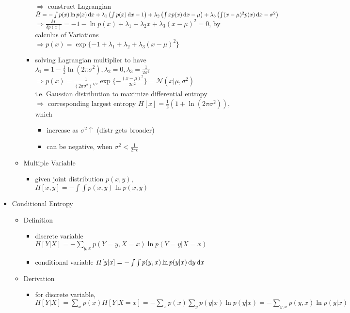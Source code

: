 \begin{itemize}
\begin{itemize}
\begin{itemize}
		$\Rightarrow$ construct Lagrangian $\tilde H = -\int p(x)\ln p(x) \mathop{}\!\mathrm{d} x + \lambda_1 \left( \int p(x)\mathop{}\!\mathrm{d} x -1 \right)+ \lambda_2\left( \int xp(x)\mathop{}\!\mathrm{d} x - \mu  \right) + \lambda_3 \left( \int (x-\mu)^2p(x)\mathop{}\!\mathrm{d} x - \sigma^2 \right)$ \\
		$\Rightarrow \frac{\delta L}{\delta p(x)} = -1 -\ln p(x)+\lambda_1 + \lambda_2 x + \lambda_3(x-\mu)^2 = 0$, by calculus of Variations \\
		$\Rightarrow p(x)=\exp \{ -1+\lambda_1+\lambda_2+\lambda_3(x-\mu)^2 \}$
		\item solving Lagrangian multiplier to have $\lambda_1=1-\frac12\ln(2\pi\sigma^2), \lambda_2=0, \lambda_3=\frac{1}{2\sigma^2}$ \\
		$\Rightarrow p(x)=\frac{1}{(2\pi\sigma^2)^{1/2}}\exp \{ -\frac{(x-\mu)^2}{2\sigma^2} \} = \mathcal N(x|\mu, \sigma^2)$ \\
		i.e. Gaussian distribution to maximize differential entropy \\
		$\Rightarrow$ corresponding largest entropy $H[x] = \frac12 (1+\ln(2\pi\sigma^2))$, which \\
			\begin{itemize}
			\item increase as $\sigma^2\uparrow$ (distr gets broader)
			\item can be negative, when $\sigma^2<\frac{1}{2\pi e}$
			\end{itemize}
		\end{itemize}
	\item Multiple Variable
		\begin{itemize}
		\item given joint distribution $p(x, y)$, $H[x,y]=-\int\int p(x, y)\ln p(x, y)$
		\end{itemize}
	\end{itemize}
\item Conditional Entropy
	\begin{itemize}
	\item Definition
		\begin{itemize}
		\item discrete variable $H[Y|X] = -\sum_{y, x}p(Y=y, X=x)\ln p(Y=y|X=x)$
		\item conditional variable $H[y|x] = -\int\int p(y, x)\ln p(y|x) \mathop{}\!\mathrm{d} y\mathop{}\!\mathrm{d} x$
		\end{itemize}
	\item Derivation
		\begin{itemize}
		\item for discrete variable, $H[Y|X] = \sum_x p(x) H[Y|X=x] = -\sum_x p(x)\sum_y p(y|x)\ln p(y|x) = -\sum_{y,x}p(y, x)\ln p(y|x)$

\end{itemize}
\end{itemize}
\end{itemize}
